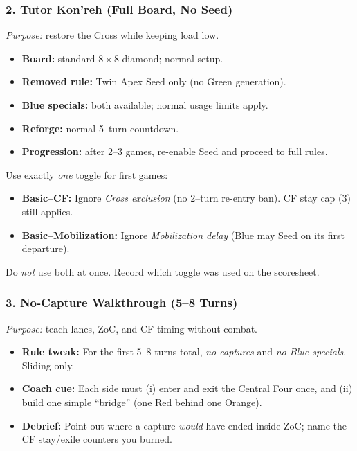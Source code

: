 \documentclass[11pt]{article}
\begin{document}
\subsubsection*{2. Tutor Kon'reh (Full Board, No Seed)}
\textit{Purpose:} restore the Cross while keeping load low.
\begin{itemize}[leftmargin=1.3em]
  \item \textbf{Board:} standard 8\,$\times$\,8 diamond; normal setup.
  \item \textbf{Removed rule:} Twin Apex Seed only (no Green generation).
  \item \textbf{Blue specials:} both available; normal usage limits apply.
  \item \textbf{Reforge:} normal 5–turn countdown.
  \item \textbf{Progression:} after 2–3 games, re-enable Seed and proceed to full rules.
\end{itemize}

\begin{rulevariant}[title={Basic Mode (Teaching Toggles)}]
Use exactly \emph{one} toggle for first games:
\begin{itemize}\itemsep0.2em
  \item \textbf{Basic–CF:} Ignore \emph{Cross exclusion} (no 2–turn re-entry ban). CF stay cap (3) still applies.
  \item \textbf{Basic–Mobilization:} Ignore \emph{Mobilization delay} (Blue may Seed on its first departure).
\end{itemize}
Do \emph{not} use both at once. Record which toggle was used on the scoresheet.
\end{rulevariant}

\subsubsection*{3. No-Capture Walkthrough (5–8 Turns)}
\textit{Purpose:} teach lanes, ZoC, and CF timing without combat.
\begin{itemize}[leftmargin=1.3em]
  \item \textbf{Rule tweak:} For the first 5–8 turns total, \emph{no captures} and \emph{no Blue specials}. Sliding only.
  \item \textbf{Coach cue:} Each side must (i) enter and exit the Central Four once, and (ii) build one simple “bridge” (one Red behind one Orange).
  \item \textbf{Debrief:} Point out where a capture \emph{would} have ended inside ZoC; name the CF stay/exile counters you burned.
\end{itemize}
\end{document}
